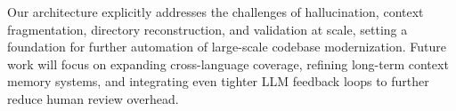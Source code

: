 \documentclass[twocolumn]{article}
\begin{document}
Our architecture explicitly addresses the challenges of hallucination, context fragmentation, directory reconstruction, and validation at scale, setting a foundation for further automation of large-scale codebase modernization. Future work will focus on expanding cross-language coverage, refining long-term context memory systems, and integrating even tighter LLM feedback loops to further reduce human review overhead.

\begingroup
  \scriptsize
  
  
\endgroup
\end{document}
